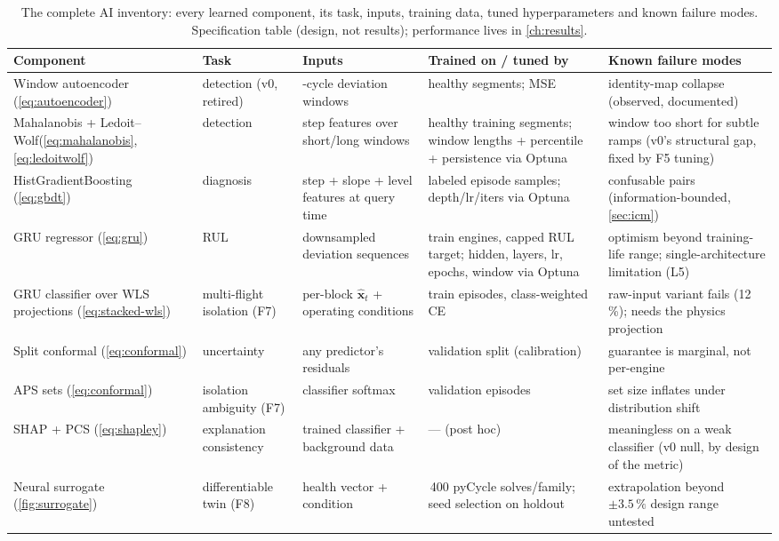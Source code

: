 \begin{table}[htbp]
  \centering\scriptsize
  \caption{The complete AI inventory: every learned component, its task, inputs,
  training data, tuned hyperparameters and known failure modes. Specification table
  (design, not results); performance lives in \cref{ch:results}.}
  \label{tab:ai-ingredients}
  \setlength{\tabcolsep}{4pt}%
  \begin{tabular}{>{\raggedright\arraybackslash}p{}>{\raggedright\arraybackslash}p{}>{\raggedright\arraybackslash}p{}>{\raggedright\arraybackslash}p{}>{\raggedright\arraybackslash}p{}}
    \toprule
    Component & Task & Inputs & Trained on / tuned by & Known failure modes \\
    \midrule
    Window autoencoder (\cref{eq:autoencoder}) & detection (v0, retired) & 100-cycle deviation windows & healthy segments; MSE & identity-map collapse (observed, documented) \\
    Mahalanobis + Ledoit--Wolf\newline(\cref{eq:mahalanobis}, \cref{eq:ledoitwolf}) & detection & step features over short/long windows & healthy training segments; window lengths + percentile + persistence via Optuna & window too short for subtle ramps (v0's structural gap, fixed by F5 tuning) \\
    Hist\-Gradient\-Boosting (\cref{eq:gbdt}) & diagnosis & step + slope + level features at query time & labeled episode samples; depth/lr/iters via Optuna & confusable pairs (information-bounded, \cref{sec:icm}) \\
    GRU regressor (\cref{eq:gru}) & RUL & downsampled deviation sequences & train engines, capped RUL target; hidden, layers, lr, epochs, window via Optuna & optimism beyond training-life range; single-architecture limitation (L5) \\
    GRU classifier over WLS projections (\cref{eq:stacked-wls}) & multi-flight isolation (F7) & per-block $\hat{\mathbf{x}}_t$ + operating conditions & train episodes, class-weighted CE & raw-input variant fails (12\,\%); needs the physics projection \\
    Split conformal (\cref{eq:conformal}) & uncertainty & any predictor's residuals & validation split (calibration) & guarantee is marginal, not per-engine \\
    APS sets (\cref{eq:conformal}) & isolation ambiguity (F7) & classifier softmax & validation episodes & set size inflates under distribution shift \\
    SHAP + PCS (\cref{eq:shapley}) & explanation consistency & trained classifier + background data & --- (post hoc) & meaningless on a weak classifier (v0 null, by design of the metric) \\
    Neural surrogate (\cref{fig:surrogate}) & differentiable twin (F8) & health vector + condition & 2\,400 pyCycle solves/family; seed selection on holdout & extrapolation beyond $\pm3.5\,\%$ design range untested \\
    \bottomrule
  \end{tabular}
\end{table}

